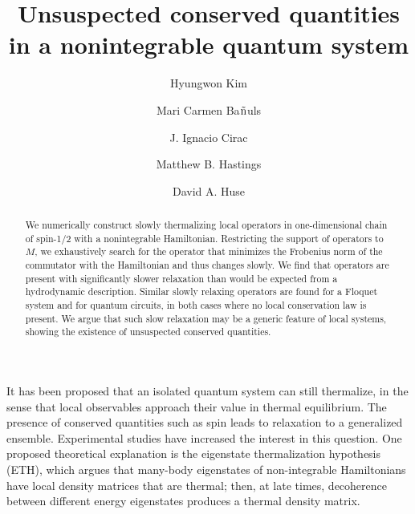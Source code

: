 \documentclass[twocolumn,superscriptaddress, prb]{revtex4-1}
\begin{document}
\title{Unsuspected conserved quantities in a nonintegrable quantum system}

\author{Hyungwon Kim}

\author{Mari Carmen Ba${\rm{\tilde n}}$uls}

\author{J. Ignacio Cirac}

\author{Matthew B. Hastings}

\author{David A. Huse}

\begin{abstract}
We numerically construct slowly thermalizing local operators in one-dimensional chain of spin-1/2 with a nonintegrable Hamiltonian.
Restricting the support of operators to $M$, we exhaustively search for the operator that minimizes the Frobenius norm of the commutator
with the Hamiltonian and thus changes slowly.  We find that operators are present with significantly slower relaxation than would be
expected from a hydrodynamic description.  Similar slowly relaxing operators are found for a Floquet system and for quantum circuits, in both cases where no local conservation law is present.  We argue that such slow relaxation may be a generic feature of local systems, showing the existence of unsuspected conserved quantities.
\end{abstract}

\pacs{}

\maketitle

It has been proposed that an isolated quantum system can still thermalize, in the sense that local observables approach their value in thermal  equilibrium\cite{Deutsch:1991,Srednicki:1994,Rigol:2008}.  The presence of conserved quantities such as spin leads to relaxation to a generalized ensemble.  Experimental studies have increased the interest in this question\cite{Polkovnikov:2011, Yukalov:2011}.  One proposed theoretical explanation is the eigenstate thermalization hypothesis (ETH)\cite{Deutsch:1991,Srednicki:1994,Rigol:2008,Santos:2010,Rigol:2012,Kruczenski:2013,Beugeling:2014,Sorg:2014,Kim_ETH}, which argues that many-body eigenstates of non-integrable Hamiltonians have local density matrices that are thermal; then, at late times, decoherence between different energy eigenstates produces a thermal density matrix.
\end{document}
